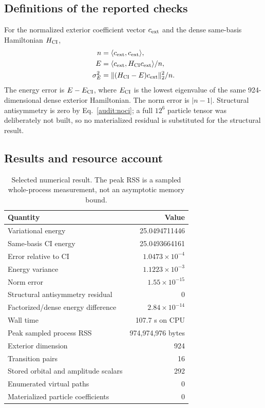\documentclass[11pt]{article}
\theoremstyle{definition}
\begin{document}
\subsection{Definitions of the reported checks}

For the normalized exterior coefficient vector $c_{\rm ext}$ and the dense
same-basis Hamiltonian $H_{\rm CI}$,
\begin{align}
n&=\langle c_{\rm ext},c_{\rm ext}\rangle,\\
E&=\langle c_{\rm ext},H_{\rm CI}c_{\rm ext}\rangle/n,\\
\sigma_E^2&=\|(H_{\rm CI}-E)c_{\rm ext}\|_2^2/n.
\end{align}
The energy error is $E-E_{\rm CI}$, where $E_{\rm CI}$ is the lowest
eigenvalue of the same 924-dimensional dense exterior Hamiltonian.  The norm
error is $|n-1|$.  Structural antisymmetry is zero by Eq.~\eqref{audit:noci};
a full $12^6$ particle tensor was deliberately not built, so no materialized
residual is substituted for the structural result.

\subsection{Results and resource account}

\begin{table}[ht]
\centering
\begin{tabular}{@{}lr@{}}
\toprule
Quantity & Value \\
\midrule
Variational energy & 25.0494711446 \\
Same-basis CI energy & 25.0493664161 \\
Error relative to CI & $1.0473\times10^{-4}$ \\
Energy variance & $1.1223\times10^{-3}$ \\
Norm error & $1.55\times10^{-15}$ \\
Structural antisymmetry residual & 0 \\
Factorized/dense energy difference & $2.84\times10^{-14}$ \\
Wall time & 107.7 s on CPU \\
Peak sampled process RSS & 974,974,976 bytes \\
Exterior dimension & 924 \\
Transition pairs & 16 \\
Stored orbital and amplitude scalars & 292 \\
Enumerated virtual paths & 0 \\
Materialized particle coefficients & 0 \\
\bottomrule
\end{tabular}
\caption{Selected numerical result.  The peak RSS is a sampled whole-process
measurement, not an asymptotic memory bound.}
\label{audit:numtable}
\end{table}
\end{document}
